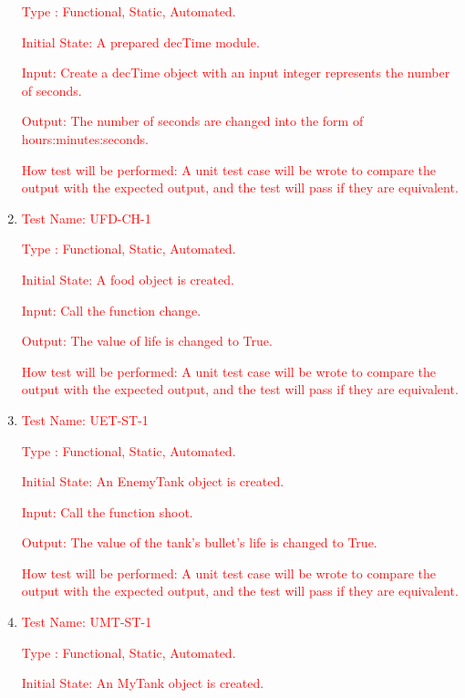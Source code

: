 \documentclass[12pt, titlepage]{article}
\begin{document}
\begin{enumerate}
\textcolor{red}{Type : Functional, Static, Automated.}

\textcolor{red}{Initial State: A prepared decTime module.}

\textcolor{red}{Input: Create a decTime object with an input integer represents the number of seconds.}

\textcolor{red}{Output: The number of seconds are changed into the form of hours:minutes:seconds.}

\textcolor{red}{How test will be performed: A unit test case will be wrote to compare the output with the expected output, and the test will pass if they are equivalent.}\\

\item{\textcolor{red}{Test Name: UFD-CH-1}}

\textcolor{red}{Type : Functional, Static, Automated.}

\textcolor{red}{Initial State: A food object is created.}

\textcolor{red}{Input: Call the function change.}

\textcolor{red}{Output: The value of life is changed to True.}

\textcolor{red}{How test will be performed: A unit test case will be wrote to compare the output with the expected output, and the test will pass if they are equivalent.}\\

\item{\textcolor{red}{Test Name: UET-ST-1}}

\textcolor{red}{Type : Functional, Static, Automated.}

\textcolor{red}{Initial State: An EnemyTank object is created.}

\textcolor{red}{Input: Call the function shoot.}

\textcolor{red}{Output: The value of the tank's bullet's life is changed to True.}

\textcolor{red}{How test will be performed: A unit test case will be wrote to compare the output with the expected output, and the test will pass if they are equivalent.}\\

\item{\textcolor{red}{Test Name: UMT-ST-1}}

\textcolor{red}{Type : Functional, Static, Automated.}

\textcolor{red}{Initial State: An MyTank object is created.}


\end{enumerate}
\end{document}

